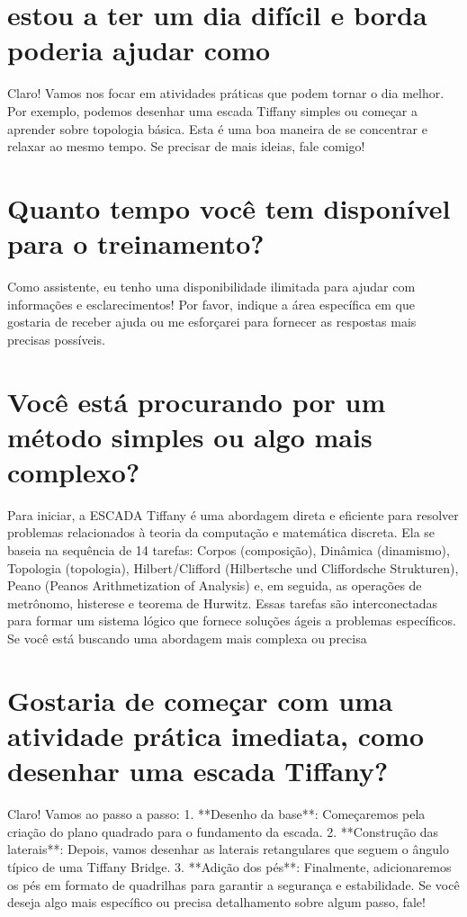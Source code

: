 \documentclass[11pt,a4paper]{article}
\begin{document}
\section{estou a ter um dia difícil e borda poderia ajudar como}
Claro! Vamos nos focar em atividades práticas que podem tornar o dia melhor. Por exemplo, podemos desenhar uma escada Tiffany simples ou começar a aprender sobre topologia básica. Esta é uma boa maneira de se concentrar e relaxar ao mesmo tempo. Se precisar de mais ideias, fale comigo!

\section{Quanto tempo você tem disponível para o treinamento?}
Como assistente, eu tenho uma disponibilidade ilimitada para ajudar com informações e esclarecimentos! Por favor, indique a área específica em que gostaria de receber ajuda ou me esforçarei para fornecer as respostas mais precisas possíveis.

\section{Você está procurando por um método simples ou algo mais complexo?}
Para iniciar, a ESCADA Tiffany é uma abordagem direta e eficiente para resolver problemas relacionados à teoria da computação e matemática discreta. Ela se baseia na sequência de 14 tarefas: Corpos (composição), Dinâmica (dinamismo), Topologia (topologia), Hilbert/Clifford (Hilbertsche und Cliffordsche Strukturen), Peano (Peanos Arithmetization of Analysis) e, em seguida, as operações de metrônomo, histerese e teorema de Hurwitz. Essas tarefas são interconectadas para formar um sistema lógico que fornece soluções ágeis a problemas específicos. Se você está buscando uma abordagem mais complexa ou precisa

\section{Gostaria de começar com uma atividade prática imediata, como desenhar uma escada Tiffany?}
Claro! Vamos ao passo a passo: 1. **Desenho da base**: Começaremos pela criação do plano quadrado para o fundamento da escada. 2. **Construção das laterais**: Depois, vamos desenhar as laterais retangulares que seguem o ângulo típico de uma Tiffany Bridge. 3. **Adição dos pés**: Finalmente, adicionaremos os pés em formato de quadrilhas para garantir a segurança e estabilidade. Se você deseja algo mais específico ou precisa detalhamento sobre algum passo, fale!
\end{document}
